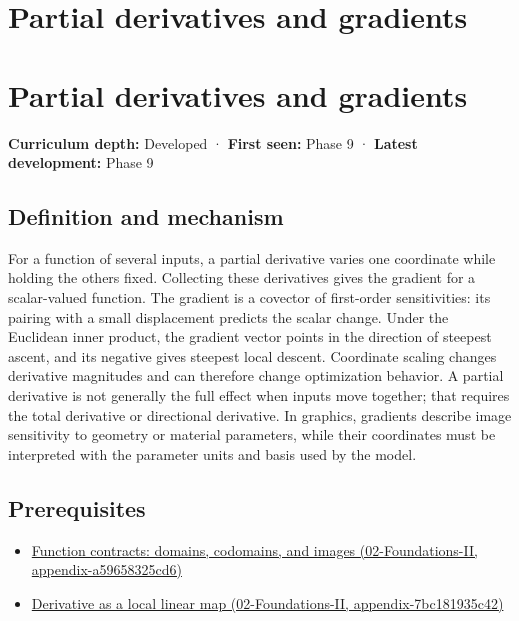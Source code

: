 \hypertarget{appendix-677b59746ae0}{}
\section*{Partial derivatives and gradients}
\section{Partial derivatives and gradients}\label{appendix-677b59746ae0-partial-derivatives-and-gradients}

\textbf{Curriculum depth:} Developed · \textbf{First seen:} Phase 9 · \textbf{Latest development:} Phase 9

\subsection{Definition and mechanism}\label{appendix-677b59746ae0-definition-and-mechanism}

For a function of several inputs, a partial derivative varies one coordinate while holding the others fixed. Collecting these derivatives gives the gradient for a scalar-valued function. The gradient is a covector of first-order sensitivities: its pairing with a small displacement predicts the scalar change. Under the Euclidean inner product, the gradient vector points in the direction of steepest ascent, and its negative gives steepest local descent. Coordinate scaling changes derivative magnitudes and can therefore change optimization behavior. A partial derivative is not generally the full effect when inputs move together; that requires the total derivative or directional derivative. In graphics, gradients describe image sensitivity to geometry or material parameters, while their coordinates must be interpreted with the parameter units and basis used by the model.

\subsection{Prerequisites}\label{appendix-677b59746ae0-prerequisites}

\begin{itemize}
\tightlist
\item
  \href{../02-Foundations-II/main.pdf\#nameddest=appendix-a59658325cd6}{Function contracts: domains, codomains, and images (02-Foundations-II, appendix-a59658325cd6)}
\item
  \href{../02-Foundations-II/main.pdf\#nameddest=appendix-7bc181935c42}{Derivative as a local linear map (02-Foundations-II, appendix-7bc181935c42)}
\end{itemize}

